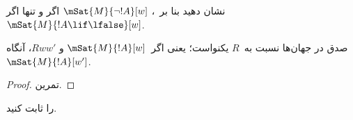 \documentclass[../../../include/open-logic-section]{subfiles}
\begin{document}
\begin{prob}
  نشان دهید بنا بر~،
  $\mSat{M}{\lnot !A}[w]$ اگر و تنها اگر
  $\mSat{M}{!A \lif \lfalse}[w]$.
\end{prob}

\begin{prop}
  صدق در جهان‌ها نسبت به~$R$ یکنواست؛ یعنی اگر~$\mSat{M}{!A}[w]$ و
  $Rww'$، آنگاه~$\mSat{M}{!A}[w']$.
\end{prop}

\begin{proof}
  تمرین.
\end{proof}

\begin{prob}
   را ثابت کنید.
\end{prob}
\end{document}
